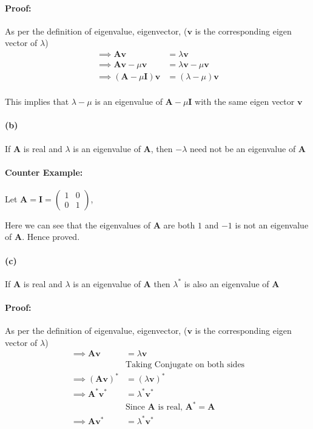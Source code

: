 \documentclass[12pt, letterpaper]{article}
\begin{document}
\paragraph{Proof:}
As per the definition of eigenvalue, eigenvector, ($\mathbf{v}$ is the corresponding eigen vector of $\lambda$)
\begin{align*}
  \implies \mathbf{A}\mathbf{v} &= \lambda \mathbf{v} \\
  \implies \mathbf{A}\mathbf{v} - \mu \mathbf{v}
                                &= \lambda \mathbf{v} - \mu \mathbf{v} \\
  \implies (\mathbf{A} - \mu \mathbf{I})\mathbf{v} &= (\lambda - \mu)\mathbf{v} \\
\end{align*}

This implies that $\lambda - \mu$ is an eigenvalue of $\mathbf{A} - \mu \mathbf{I}$ with the same eigen vector $\mathbf{v}$

\paragraph{(b)} If $\mathbf{A}$ is real and $\lambda$ is an eigenvalue of $\mathbf{A}$, then $-\lambda$ need not be an eigenvalue of $\mathbf{A}$

\paragraph{Counter Example:} Let $\mathbf{A} = \mathbf{I} = \begin{pmatrix} 1 & 0 \\ 0 & 1 \end{pmatrix}$,

 Here we can see that the eigenvalues of $\mathbf{A}$ are both $1$ and $-1$ is not an eigenvalue of $\mathbf{A}$. Hence proved.

\paragraph{(c)} If $\mathbf{A}$ is real and $\lambda$ is an eigenvalue of $\mathbf{A}$ then $\lambda^{*}$ is also an eigenvalue of $\mathbf{A}$

\paragraph{Proof:}
As per the definition of eigenvalue, eigenvector, ($\mathbf{v}$ is the corresponding eigen vector of $\lambda$)
\begin{align*}
  \implies \mathbf{A}\mathbf{v} &= \lambda \mathbf{v} \\
  &\text{Taking Conjugate on both sides} \\
  \implies (\mathbf{A}\mathbf{v})^{*} &= (\lambda \mathbf{v})^{*} \\
  \implies \mathbf{A}^{*}\mathbf{v}^{*} &= \lambda^{*} \mathbf{v}^{*} \\
  &\text{Since $\mathbf{A}$ is real, $\mathbf{A}^{*} = \mathbf{A}$} \\
  \implies \mathbf{A}\mathbf{v}^{*} &= \lambda^{*} \mathbf{v}^{*} \\
\end{align*}
\end{document}
